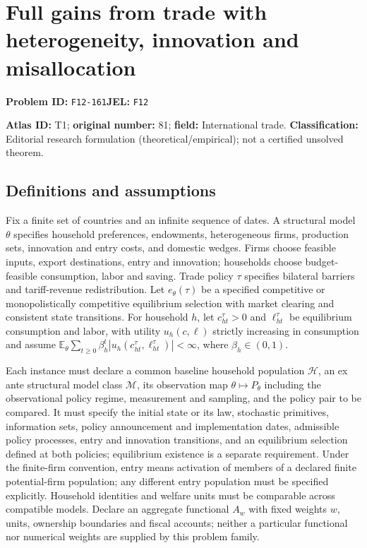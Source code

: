 \documentclass[11pt,a4paper]{article}
\begin{document}
\section*{Full gains from trade with heterogeneity, innovation and misallocation}
\textbf{Problem ID:} \texttt{F12-161}\quad \textbf{JEL:} \texttt{F12}\par
\label{problem:OP-0081}
\label{audited:ECON-079}
\label{atlas:prob:T1}

\noindent\textbf{Atlas ID:} T1; \textbf{original number:} 81; \textbf{field:} International trade. \textbf{Classification:} Editorial research formulation (theoretical/empirical); not a certified unsolved theorem.

\subsection*{Definitions and assumptions}
Fix a finite set of countries and an infinite sequence of dates. A structural model $\theta$ specifies household preferences, endowments, heterogeneous firms, production sets, innovation and entry costs, and domestic wedges. Firms choose feasible inputs, export destinations, entry and innovation; households choose budget-feasible consumption, labor and saving. Trade policy $\tau$ specifies bilateral barriers and tariff-revenue redistribution. Let $e_\theta(\tau)$ be a specified competitive or monopolistically competitive equilibrium selection with market clearing and consistent state transitions. For household $h$, let $c_{ht}^\tau>0$ and $\ell_{ht}^\tau$ be equilibrium consumption and labor, with utility $u_h(c,\ell)$ strictly increasing in consumption and assume $\mathbb E_\theta\sum_{t\ge0}\beta_h^t|u_h(c_{ht}^\tau,\ell_{ht}^\tau)|<\infty$, where $\beta_h\in(0,1)$.

Each instance must declare a common baseline household population $\mathcal H$, an ex ante structural model class $\mathcal M$, its observation map $\theta\mapsto P_\theta$ including the observational policy regime, measurement and sampling, and the policy pair to be compared. It must specify the initial state or its law, stochastic primitives, information sets, policy announcement and implementation dates, admissible policy processes, entry and innovation transitions, and an equilibrium selection defined at both policies; equilibrium existence is a separate requirement. Under the finite-firm convention, entry means activation of members of a declared finite potential-firm population; any different entry population must be specified explicitly. Household identities and welfare units must be comparable across compatible models. Declare an aggregate functional $A_w$ with fixed weights $w$, units, ownership boundaries and fiscal accounts; neither a particular functional nor numerical weights are supplied by this problem family.
\end{document}
